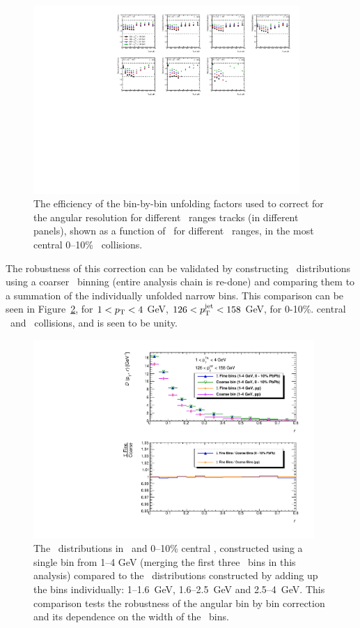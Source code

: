 \begin{figure}
\centering
\includegraphics[page=1, width=0.9\textwidth]{figures/main/corrections/RespEfficiency_PbPb}
\caption{The efficiency of the bin-by-bin unfolding factors used to correct for the angular resolution for different \pttrk\ ranges tracks (in different panels), shown as a function of \rvar\ for different \ptjet\ ranges, in the most central 0--10\% \pbpb\ collisions.}
\label{fig:RespEfficiency_PbPb}
\end{figure}

The robustness of this correction can be validated by constructing \Dptr\ distributions using a coarser \pt\ binning (entire analysis chain is re-done) and comparing them to a summation of the individually unfolded narrow bins.
This comparison can be seen in Figure~\ref{fig:MergedBinCheck}, for $1 < \mbox{$p_{\mathrm{T}}$} < 4$ GeV, $126 < \mbox{$p_{\mathrm{T}}^{\mathrm{jet}}$} < 158$ GeV,  for 0-10\%.
central \pbpb\ and \pp\ collisions, and is seen to be unity.

\begin{figure}
\includegraphics[width=0.95\textwidth]{figures/main/general/MergedBinCheck.pdf}
\caption{The \Dptr\ distributions in \pp\ and 0--10\% central \pbpb, constructed using a single bin from 1--4 GeV (merging the first three \pt\ bins in this analysis) compared to the \Dptr\ distributions constructed by adding up the bins individually: \mbox{1--1.6 GeV}, \mbox{1.6--2.5 GeV} and \mbox{2.5--4 GeV}.
This comparison tests the robustness of the angular bin by bin correction and its dependence on the width of the \pt\ bins.}
\label{fig:MergedBinCheck}
\end{figure}


